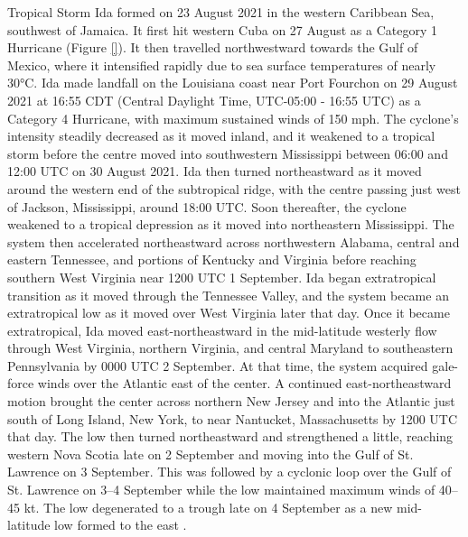 Tropical  Storm Ida formed on 23 August 2021 in the western Caribbean Sea, southwest of Jamaica. It first hit western Cuba on 27 August as a Category 1 Hurricane (Figure \ref{}). It then travelled northwestward towards the Gulf of Mexico, where it intensified rapidly due to sea surface temperatures of nearly 30°C. Ida made landfall on the Louisiana coast near Port Fourchon on 29 August 2021 at 16:55 CDT (Central Daylight Time, UTC-05:00 - 16:55 UTC) as a Category 4 Hurricane, with maximum sustained winds of 150 mph. The cyclone’s intensity steadily decreased as it moved inland, and it weakened to a tropical storm before the centre moved into southwestern Mississippi between 06:00 and 12:00 UTC on 30 August 2021. Ida then turned northeastward as it moved around the western end of the subtropical ridge, with the centre passing just west of Jackson, Mississippi, around 18:00 UTC. Soon thereafter, the cyclone weakened to a tropical depression as it moved into northeastern Mississippi. The system then accelerated northeastward across northwestern Alabama, central and eastern Tennessee, and portions of Kentucky and Virginia before reaching southern West Virginia near 1200 UTC 1 September. Ida began extratropical transition as it moved through the Tennessee Valley, and the system became an extratropical low as it moved over West Virginia later that day. Once it became extratropical, Ida moved east-northeastward in the mid-latitude westerly flow through West Virginia, northern Virginia, and central Maryland to southeastern Pennsylvania by 0000 UTC 2 September. At that time, the system acquired gale-force winds over the Atlantic east of the center. A continued east-northeastward motion brought the center across northern New Jersey and into the Atlantic just south of Long Island, New York, to near Nantucket, Massachusetts by 1200 UTC that day. The low then turned northeastward and strengthened a little, reaching western Nova Scotia late on 2 September and moving into the Gulf of St. Lawrence on 3 September. This was followed by a cyclonic loop over the Gulf of St. Lawrence on 3–4 September while the low maintained maximum winds of 40–45 kt. The low degenerated to a trough late on 4 September as a new mid-latitude low formed to the east \citep{Beven_2022}.

